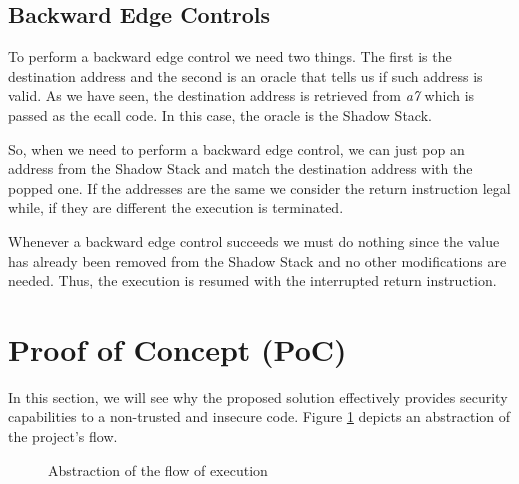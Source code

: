 \subsection{Backward Edge Controls}
\label{subsec:backward}

To perform a backward edge control we need two things. The first is the
destination address and the second is an oracle that tells us if such address is
valid. As we have seen, the destination address is retrieved from \textit{a7} which
is passed as the ecall code. In this case, the oracle is the Shadow Stack.

So, when we need to perform a backward edge control, we can just pop an address from
the Shadow Stack and match the destination address with the popped one. If the
addresses are the same we consider the return instruction legal while, if they are
different the execution is terminated.

Whenever a backward edge control succeeds we must do nothing since the value has
already been removed from the Shadow Stack and no other modifications are needed.
Thus, the execution is resumed with the interrupted return instruction.

\section{Proof of Concept (PoC)}
\label{sec:project_poc}

In this section, we will see why the proposed solution effectively provides security
capabilities to a non-trusted and insecure code. Figure \ref{fig:functioning}
depicts an abstraction of the project's flow.

\begin{figure}[htbp]
  \centering
  \def\stackalignment{r} %
  {\scriptsize }
  \caption{Abstraction of the flow of execution}
  \label{fig:functioning}
\end{figure}

